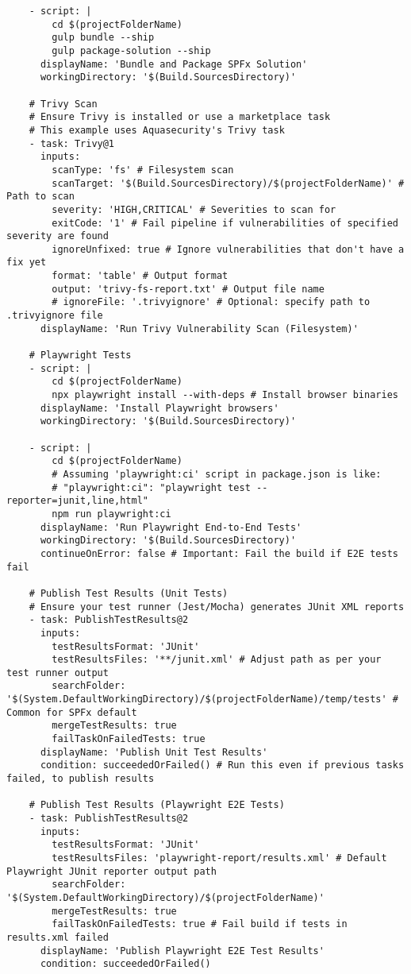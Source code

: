 \begin{verbatim}
    - script: |
        cd $(projectFolderName)
        gulp bundle --ship
        gulp package-solution --ship
      displayName: 'Bundle and Package SPFx Solution'
      workingDirectory: '$(Build.SourcesDirectory)'

    # Trivy Scan
    # Ensure Trivy is installed or use a marketplace task
    # This example uses Aquasecurity's Trivy task
    - task: Trivy@1
      inputs:
        scanType: 'fs' # Filesystem scan
        scanTarget: '$(Build.SourcesDirectory)/$(projectFolderName)' # Path to scan
        severity: 'HIGH,CRITICAL' # Severities to scan for
        exitCode: '1' # Fail pipeline if vulnerabilities of specified severity are found
        ignoreUnfixed: true # Ignore vulnerabilities that don't have a fix yet
        format: 'table' # Output format
        output: 'trivy-fs-report.txt' # Output file name
        # ignoreFile: '.trivyignore' # Optional: specify path to .trivyignore file
      displayName: 'Run Trivy Vulnerability Scan (Filesystem)'

    # Playwright Tests
    - script: |
        cd $(projectFolderName)
        npx playwright install --with-deps # Install browser binaries
      displayName: 'Install Playwright browsers'
      workingDirectory: '$(Build.SourcesDirectory)'

    - script: |
        cd $(projectFolderName)
        # Assuming 'playwright:ci' script in package.json is like:
        # "playwright:ci": "playwright test --reporter=junit,line,html"
        npm run playwright:ci
      displayName: 'Run Playwright End-to-End Tests'
      workingDirectory: '$(Build.SourcesDirectory)'
      continueOnError: false # Important: Fail the build if E2E tests fail

    # Publish Test Results (Unit Tests)
    # Ensure your test runner (Jest/Mocha) generates JUnit XML reports
    - task: PublishTestResults@2
      inputs:
        testResultsFormat: 'JUnit'
        testResultsFiles: '**/junit.xml' # Adjust path as per your test runner output
        searchFolder: '$(System.DefaultWorkingDirectory)/$(projectFolderName)/temp/tests' # Common for SPFx default
        mergeTestResults: true
        failTaskOnFailedTests: true
      displayName: 'Publish Unit Test Results'
      condition: succeededOrFailed() # Run this even if previous tasks failed, to publish results

    # Publish Test Results (Playwright E2E Tests)
    - task: PublishTestResults@2
      inputs:
        testResultsFormat: 'JUnit'
        testResultsFiles: 'playwright-report/results.xml' # Default Playwright JUnit reporter output path
        searchFolder: '$(System.DefaultWorkingDirectory)/$(projectFolderName)'
        mergeTestResults: true
        failTaskOnFailedTests: true # Fail build if tests in results.xml failed
      displayName: 'Publish Playwright E2E Test Results'
      condition: succeededOrFailed()


\end{verbatim}
